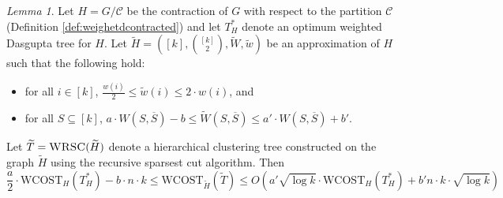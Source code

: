\documentclass[letterpaper,11pt]{article}
\newcommand{\wCT}{\text{WCOST}}
\newcommand{\cC}{\mathcal{C}}
\theoremstyle{plain}
\theoremstyle{definition}
\theoremstyle{remark}
\newtheorem{lemmma}{Lemma}
\newcommand{\wt}[1]{\widetilde{#1}}
\begin{document}
\begin{lemmma} \label{lem:general:est:tstar}
 Let $H = G/\cC$ be the contraction of $G$ with respect to the partition $\cC $ (Definition \ref{def:weighetdcontracted}) and  let $T^*_H$ denote an optimum weighted Dasgupta tree for $H$. Let  $\widetilde{H}= \left([k], {[k] \choose 2}, \widetilde{W}, \widetilde{w}\right)$ be an approximation of $H$ such that the following hold:
\begin{itemize}
\item for all $i\in[k]$, $ \frac{w(i)}{2}\leq \wt{w}(i) \leq 2 \cdot w(i)$, and 
\item for all $S \subseteq [k]$, $a \cdot W(S, \overline{S}) - b \leq \wt{W}(S, \overline{S}) \leq a' \cdot W(S, \overline{S}) + b'$.
\end{itemize}

Let $\widetilde{T} = \textsc{WRSC}(\widetilde{H})$ denote a hierarchical clustering tree constructed on the graph $\widetilde{H}$ using the recursive sparsest cut algorithm. Then
\[
		\frac{a}{2}\cdot \wCT_{H}(T^*_{H}) - b\cdot n \cdot k   \leq \wCT_{\wt{H}}(\widetilde{T}) \leq O\left(a' \sqrt{\log k} \cdot \wCT_{H}(T^*_{H}) + b' n \cdot k \cdot \sqrt{\log k}\right)
	\]
\end{lemmma}
\end{document}
